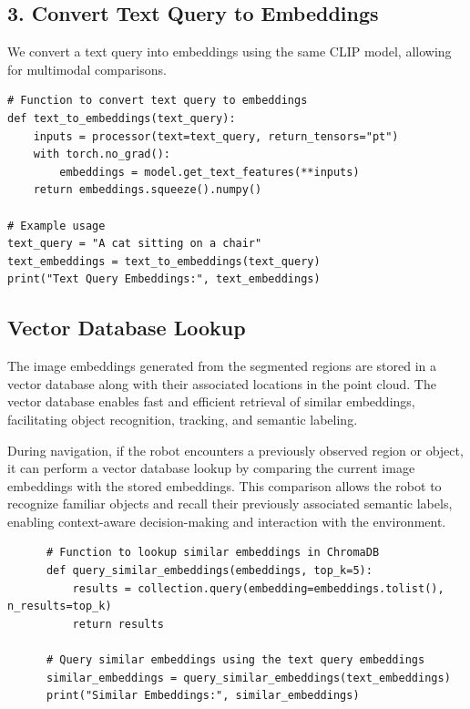 \subsection*{3. Convert Text Query to Embeddings}

We convert a text query into embeddings using the same CLIP model, allowing for
multimodal comparisons. \cite{che2024enhancingmultimodalunderstandingclipbased}

\begin{lstlisting}
# Function to convert text query to embeddings
def text_to_embeddings(text_query):
    inputs = processor(text=text_query, return_tensors="pt")
    with torch.no_grad():
        embeddings = model.get_text_features(**inputs)
    return embeddings.squeeze().numpy()

# Example usage
text_query = "A cat sitting on a chair"
text_embeddings = text_to_embeddings(text_query)
print("Text Query Embeddings:", text_embeddings)
\end{lstlisting}

\subsection{Vector Database Lookup}

The image embeddings generated from the segmented regions are stored in a
vector database along with their associated locations in the point cloud. The
vector database enables fast and efficient retrieval of similar embeddings,
facilitating object recognition, tracking, and semantic labeling.

During navigation, if the robot encounters a previously observed region or
object, it can perform a vector database lookup by comparing the current image
embeddings with the stored embeddings. This comparison allows the robot to
recognize familiar objects and recall their previously associated semantic
labels, enabling context-aware decision-making and interaction with the
environment.\cite{douze2024faisslibrary}

\begin{lstlisting}
      # Function to lookup similar embeddings in ChromaDB
      def query_similar_embeddings(embeddings, top_k=5):
          results = collection.query(embedding=embeddings.tolist(), n_results=top_k)
          return results
      
      # Query similar embeddings using the text query embeddings
      similar_embeddings = query_similar_embeddings(text_embeddings)
      print("Similar Embeddings:", similar_embeddings)
      \end{lstlisting}

